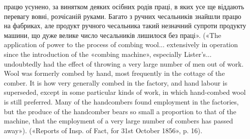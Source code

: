 працю усунено, за винятком деяких осібних родів праці, в яких усе ще віддають
перевагу вовні, розчісаній руками. Багато з ручних чесальників
знайшли працю на фабриках, але продукт ручного чесальника такий незначний
супроти продукту машини, що дуже велике число чесальників
лишилося без праці». («The application of power to the process of combing
wool... extensively in operation since the introduction of the «combing
machine», especially Lister’s... undoubtedly had the effect of throwing
a very large number of men out of work. Wool was formerly combed by
hand, most frequently in the cottage of the comber. It is how very generally
combed in the factory, and hand labour is superseded, except in some particular
kinds of work, in which hand-combed wool is still preferred. Many
of the handcombers found employment in the factories, but the produce of
the handcomber bears so small a proportion to that of the machine, that
the employment of a very large number of combers has passed away»). («Reports
of Insp. of Fact, for 31st October 1856», p. 16).
\parbreak{}  %
